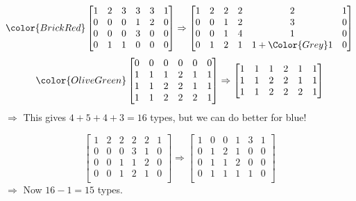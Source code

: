 \begin{frame}
	\begin{equation}
	\color{BrickRed}
    \begin{bmatrix}
         1&2&3&3&3&1\\
         0&0&0&1&2&0\\
         0&0&0&3&0&0\\
         0&1&1&0&0&0\\
    \end{bmatrix}\Rightarrow \begin{bmatrix}
	    1&2&2&2&2&1\\
         0&0&1&2&3&0\\
         0&0&1&4&1&0\\
	    0&1&2&1&1+\Color{Grey}1&0\\
    \end{bmatrix}
\end{equation}
\begin{equation}
\color{OliveGreen}
    \begin{bmatrix}
         0&0&0&0&0&0\\
         1&1&1&2&1&1\\
         1&1&2&2&1&1\\
         1&1&2&2&2&1\\

    \end{bmatrix}\Rightarrow \begin{bmatrix}
         1&1&1&2&1&1\\
         1&1&2&2&1&1\\
         1&1&2&2&2&1\\

    \end{bmatrix}
\end{equation}
$\Rightarrow$ This gives $4+5+4+3=16$ types, but we can do better for blue!
	\begin{frame}
	\begin{equation}

    \begin{bmatrix}
        1&2&2&2&2&1\\
        0&0&0&3&1&0\\
        0&0&1&1&2&0\\
        0&0&1&2&1&0\\
    \end{bmatrix} \Rightarrow \begin{bmatrix}
	    1& 0& 0& 1& 3& 1\\
	    0& 1& 2& 1& 0& 0\\
	    0& 1& 1& 2& 0& 0\\
	    0& 1& 1& 1& 1& 0 \\
    \end{bmatrix}
	\end{equation}
    $\Rightarrow$ Now $16-1=15$ types.
\end{frame}


\end{frame}
